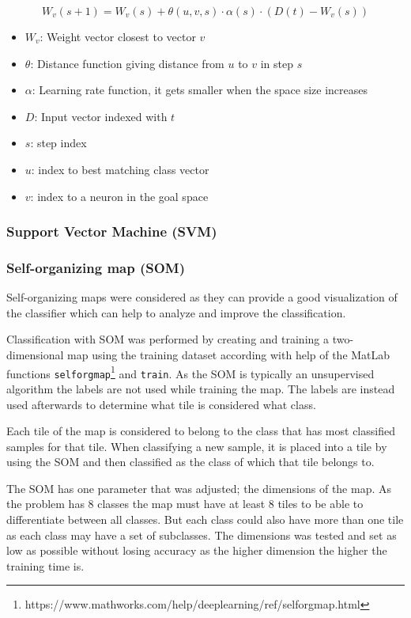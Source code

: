 \documentclass[doc/report.tex]{subfiles}
\begin{document}
\begin{equation}
    W_v(s+1) = W_v(s) + \theta(u, v, s) \cdot \alpha(s) \cdot (D(t) - W_v(s))
    \label{eqn:som_w}
\end{equation}

\begin{itemize}
    \item $W_v$: Weight vector closest to vector $v$
    \item $\theta$: Distance function giving distance from $u$ to $v$ in step
        $s$
    \item $\alpha$: Learning rate function, it gets smaller when the space size
        increases
    \item $D$: Input vector indexed with $t$
    \item $s$: step index
    \item $u$: index to best matching class vector
    \item $v$: index to a neuron in the goal space
\end{itemize}

\subsubsection{Support Vector Machine (SVM)}

\subsubsection{Self-organizing map (SOM)}
Self-organizing maps were considered as they can provide a good visualization
of the classifier which can help to analyze and improve the classification.

Classification with SOM was performed by creating and training a
two-dimensional map using the training dataset according with help of the
MatLab functions
\texttt{selforgmap}\footnote{https://www.mathworks.com/help/deeplearning/ref/selforgmap.html}
and \texttt{train}. As the SOM is typically an unsupervised algorithm the
labels are not used while training the map. The labels are instead used
afterwards to determine what tile is considered what class.

Each tile of the map is considered to belong to the class that has most
classified samples for that tile. When classifying a new sample, it is placed
into a tile by using the SOM and then classified as the class of which that
tile belongs to.

The SOM has one parameter that was adjusted; the dimensions of the map. As the
problem has 8 classes the map must have at least 8 tiles to be able to
differentiate between all classes. But each class could also have more than one
tile as each class may have a set of subclasses. The dimensions was tested and
set as low as possible without losing accuracy as the higher dimension the
higher the training time is.
\end{document}
